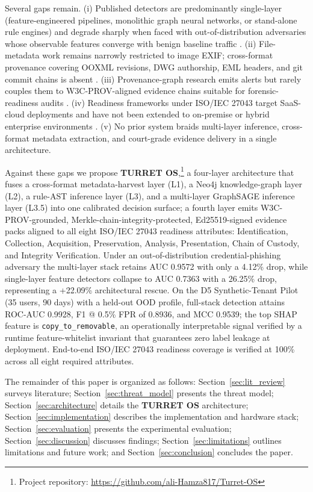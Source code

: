 Several gaps remain. (i) Published detectors are predominantly single-layer (feature-engineered pipelines, monolithic graph neural networks, or stand-alone rule engines) and degrade sharply when faced with out-of-distribution adversaries whose observable features converge with benign baseline traffic \citep{wei2024ewatcher, xiao2024sentinel, gao2023dtgi}. (ii) File-metadata work remains narrowly restricted to image EXIF; cross-format provenance covering OOXML revisions, DWG authorship, EML headers, and git commit chains is absent \citep{umair2024exif2vec, yasenenko2025evaluating, didriksen2014ooxml, fu2015docx}. (iii) Provenance-graph research emits alerts but rarely couples them to W3C-PROV-aligned evidence chains suitable for forensic-readiness audits \citep{ren2022cskg4apt, kurniawan2022krystal, aki2025provenance, li2021threat}. (iv) Readiness frameworks under ISO/IEC 27043 target SaaS-cloud deployments and have not been extended to on-premise or hybrid enterprise environments \citep{shoderu2025dfrsaas, shoderu2026dfrconference}. (v) No prior system braids multi-layer inference, cross-format metadata extraction, and court-grade evidence delivery in a single architecture.

Against these gaps we propose \textbf{TURRET OS},\footnote{Project repository: \url{https://github.com/ali-Hamza817/Turret-OS}} a four-layer architecture that fuses a cross-format metadata-harvest layer (L1), a Neo4j knowledge-graph layer (L2), a rule-AST inference layer (L3), and a multi-layer GraphSAGE inference layer (L3.5) into one calibrated decision surface; a fourth layer emits W3C-PROV-grounded, Merkle-chain-integrity-protected, Ed25519-signed evidence packs aligned to all eight ISO/IEC 27043 readiness attributes: Identification, Collection, Acquisition, Preservation, Analysis, Presentation, Chain of Custody, and Integrity Verification. Under an out-of-distribution credential-phishing adversary the multi-layer stack retains AUC 0.9572 with only a 4.12\% drop, while single-layer feature detectors collapse to AUC 0.7363 with a 26.25\% drop, representing a +22.09\% architectural rescue. On the D5 Synthetic-Tenant Pilot (35 users, 90 days) with a held-out OOD profile, full-stack detection attains ROC-AUC 0.9928, F1 @ 0.5\% FPR of 0.8936, and MCC 0.9539; the top SHAP feature is \texttt{copy\_to\_removable}, an operationally interpretable signal verified by a runtime feature-whitelist invariant that guarantees zero label leakage at deployment. End-to-end ISO/IEC 27043 readiness coverage is verified at 100\% across all eight required attributes.

The remainder of this paper is organized as follows: Section~\ref{sec:lit_review} surveys literature; Section~\ref{sec:threat_model} presents the threat model; Section~\ref{sec:architecture} details the \textbf{TURRET OS} architecture; Section~\ref{sec:implementation} describes the implementation and hardware stack; Section~\ref{sec:evaluation} presents the experimental evaluation; Section~\ref{sec:discussion} discusses findings; Section~\ref{sec:limitations} outlines limitations and future work; and Section~\ref{sec:conclusion} concludes the paper.
